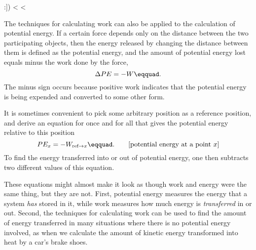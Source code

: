 \vfill
:])
<%
<%

The techniques for calculating work can also be applied to
the calculation of potential energy. If a certain force
depends only on the distance between the two participating
objects, then the energy released by changing the distance
between them is defined as the potential energy, and the
amount of potential energy lost equals minus the work done by the force,
\begin{equation*}
                \Delta PE  =  -W\eqquad.
\end{equation*}
The minus sign occurs because positive work indicates that
the potential energy is being expended and converted to some other form.

It is sometimes convenient to pick some arbitrary position
as a reference position, and derive an equation for once and
for all that gives the potential energy relative to this position
\begin{equation*}
                PE_x  =  -W_{\text{ref}\rightarrow x}\eqquad.    
\qquad  \text{[potential energy at a point $x$]}
\end{equation*}
To find the energy transferred into or out of potential
energy, one then subtracts two different values of this equation.

These equations might almost make it look as though work and
energy were the same thing, but they are not. First,
potential energy measures the energy that a system
\emph{has} stored in it, while work measures how much energy
is \emph{transferred} in or out. Second, the techniques for
calculating work can be used to find the amount of energy
transferred in many situations where there is no potential
energy involved, as when we calculate the amount of kinetic
energy transformed into heat by a car's brake shoes.

